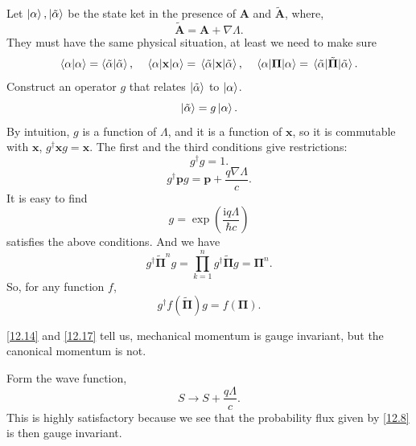 \documentclass{article}
\theoremstyle{1}
\newcommand{\ii}{\mathrm{i}}
\begin{document}
Let $\ket{\alpha},\ket{\tilde{\alpha}}$ be the state ket in the presence of $\mathbf{A}$ and $\tilde{\mathbf{A}}$, where,
\begin{equation}
    \tilde{\mathbf{A}}=\mathbf{A}+\nabla \Lambda.
\end{equation}
They must have the same physical situation, at least we need to make sure
\begin{equation}
   \braket{\alpha}=\braket{\tilde{\alpha}} ,\quad \expval{\mathbf{x}}{\alpha}=\expval{\mathbf{x}}{\tilde{\alpha}},\quad \expval{\mathbf{\Pi}}{\alpha}=\expval{\tilde{\mathbf{\Pi}}}{\tilde{\alpha}}.
\end{equation}
Construct an operator $g$ that relates $\ket{\tilde{\alpha}}$ to $\ket{\alpha}$.
\begin{equation}
    \ket{\tilde{\alpha}}=g\ket{\alpha}.
\end{equation}
By intuition, $g$ is a function of $\Lambda$, and it is a function of $\mathbf{x}$, so it is commutable with $\mathbf{x}$, $g^\dagger\mathbf{x} g=\mathbf{x}$. The first and the third conditions give restrictions:
\begin{equation}
    g^\dagger g=1.
\end{equation}
    \begin{equation}\label{12.14}
    g^\dagger \mathbf{p}g=\mathbf{p}+\frac{q\nabla\Lambda}{c}.
\end{equation}
It is easy to find 
\begin{equation}
    g=\exp\left(\frac{\ii q\Lambda}{\hbar c}\right)
\end{equation}
satisfies the above conditions. And we have 
\begin{equation}
    g^\dagger \tilde{\mathbf{\Pi}}^ng=\prod_{k=1}^{n}g^\dagger \tilde{\mathbf{\Pi}}g=\mathbf{\Pi}^n.
\end{equation}
So, for any function $f$,
\begin{equation}\label{12.17}
    g^\dagger f\left(\tilde{\mathbf{\Pi}}\right) g=f\left(\mathbf{\Pi}\right).
\end{equation}

\eqref{12.14} and \eqref{12.17} tell us, mechanical momentum is gauge invariant, but the canonical momentum is not.

Form the wave function, 
\begin{equation}
    S\longrightarrow S+\frac{q\Lambda}{c}.
\end{equation}
This is highly satisfactory because we see that the probability flux given by \eqref{12.8} is then gauge invariant. 
\end{document}
